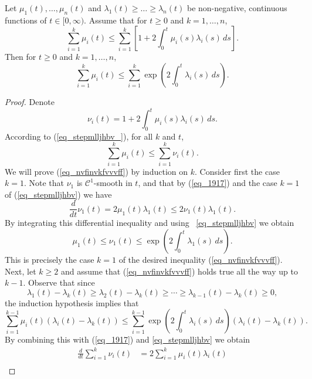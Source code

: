 \documentclass[10pt,a4paper]{amsart}
\begin{document}
\begin{lemma} Let $\mu_1(t), \ldots, \mu_n(t)$ and $\lambda_1(t) \geq \ldots \geq \lambda_n(t)$ be non-negative, continuous functions of $t \in [0, \infty)$.
Assume that  for $t \geq 0$ and $k=1,\ldots,n$,
\begin{equation}\label{eq_stepmlljhbv_}
\sum_{i=1}^k \mu_i(t)
\leq \sum_{i=1}^k \left[ 1 + 2 \int_0^t \mu_i (s) \lambda_i (s) \, ds \right].
\end{equation}
Then for $t \geq 0$ and $k=1,\ldots,n$, 
\begin{equation}\label{eq_nvfinvkfvvvff}
\sum_{i=1}^k \mu_i (t) \leq \sum_{i=1}^k \exp \left( 2 \int_0^t \lambda_i (s) \, ds \right).
\end{equation}
\label{lem_2230}
\end{lemma}

\begin{proof} Denote
\begin{equation}  \nu_i(t) = 1 + 2 \int_0^t \mu_i (s) \lambda_i (s) \, ds. \label{eq_1917} \end{equation}
According to (\ref{eq_stepmlljhbv_}), for all $k$ and $t$,
\begin{equation}\label{eq_stepmlljhbv}
\sum_{i=1}^k \mu_i(t)
\leq \sum_{i=1}^k \nu_i(t).
\end{equation}
We will prove (\ref{eq_nvfinvkfvvvff}) by induction on $k$. Consider first the case $k=1$.
Note that $\nu_1$ is $\mathcal C^1$-smooth in $t$, and
that by (\ref{eq_1917}) and the case $k=1$  of (\ref{eq_stepmlljhbv}) we have
\[
\frac d{dt} \nu_1 (t) = 2 \mu_1 (t) \lambda_1 (t)
\leq 2 \nu_1(t) \lambda_1 (t) .
\]
By integrating this differential inequality and
using ~\eqref{eq_stepmlljhbv} we obtain 
\[
\mu_1 (t) \leq \nu_1 (t) \leq
\exp \left( 2 \int_0^t \lambda_1 (s) \, ds \right).
\]
This is precisely the case $k=1$ of the desired inequality (\ref{eq_nvfinvkfvvvff}).
Next, let $k \geq 2$ and assume that (\ref{eq_nvfinvkfvvvff})
holds true all the way up
to $k-1$. Observe that since
\[
\lambda_1 (t) -\lambda_k (t) \geq \lambda_2(t) - \lambda_k(t) \geq \dotsb \geq \lambda_{k-1} (t) - \lambda_k (t) \geq 0 ,
\]
the induction hypothesis implies that
\[
\sum_{i=1}^{k-1} \mu_i (t) (\lambda_i (t) - \lambda_k (t) )
\leq \sum_{i=1}^{k-1} \exp \left( 2 \int_0^t \lambda_i(s) \,ds  \right)
(\lambda_i (t) - \lambda_k (t) ) .
\]
By combining this with (\ref{eq_1917}) and \eqref{eq_stepmlljhbv} we obtain
\[
\begin{split}
\frac{d}{dt} \sum_{i=1}^k \nu_i (t)
& = 2 \sum_{i=1}^k \mu_i (t) \lambda_i (t) \\

\end{split}\]
\end{proof}
\end{document}
